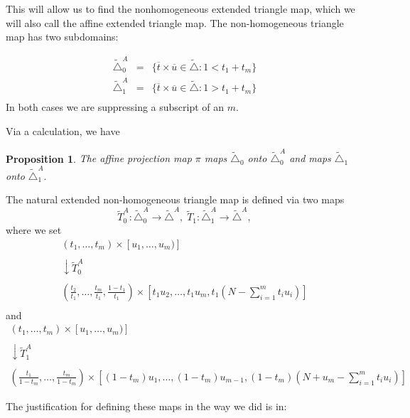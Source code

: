 \documentclass[12pt,oneside,openany]{article}
\newtheorem{prop}[theorem]{Proposition}
\begin{document}
This will allow us to find the nonhomogeneous extended triangle map, which we will also call the affine extended triangle map.
The non-homogeneous triangle map has two subdomains:

\begin{eqnarray*}
\tilde{\triangle}_0^A &=& \{  \overline{t}  \times \overline{u}     \in \tilde{\triangle} : 1<t_1+t_m\}  \\
\tilde{\triangle}_1^A &=& \{ \overline{t}  \times \overline{u}   \in \tilde{\triangle} : 1>t_1+t_m\}  \\
\end{eqnarray*}
In both cases we are suppressing a subscript of an $m$.

Via a calculation, we have 
\begin{prop} The affine projection map $\pi$ maps $\tilde{\triangle}_0$ onto $  \tilde{\triangle}_0^A$ and maps  $\tilde{\triangle}_1$ onto $  \tilde{\triangle}_1^A.$
\end{prop}

The natural extended non-homogeneous triangle map is defined via two maps
$$\tilde{T}_0^A:\tilde{\triangle}_0^A \rightarrow \tilde{\triangle}^A, \; \tilde{T}_1:\tilde{\triangle}_1^A \rightarrow \tilde{\triangle}^A,$$
where we set 
$$\begin{array}{c}
(t_1, \ldots, t_m) \times  [u_1, \ldots, u_m)] \\ \\
\downarrow \tilde{T}_0^A \\ \\
\left(   \frac{t_2}{t_1}, \ldots, \frac{t_m}{t_1}, \frac{1-t_1}{t_1}        \right) \times \left[  t_1 u_2, \ldots, t_1u_m, t_1 \left( N- \sum_{i=1}^m t_i u_i \right)   \right] \\
\end{array}$$
and 
$$\begin{array}{c}
(t_1, \ldots, t_m) \times  [u_1, \ldots, u_m)] \\ \\
\downarrow \tilde{T}_1^A \\ \\
\left(  \frac{t_1}{1-t_m}, \ldots,  \frac{t_m}{1-t_m}  \right) \times \left[  (1-t_m) u_1, \ldots, (1-t_m) u_{m-1} , (1-t_m)  \left( N+ u_m- \sum_{i=1}^m t_i u_i \right)   \right]
\end{array}$$



The justification for defining these maps in the way we did is in:
\end{document}
